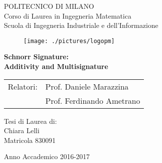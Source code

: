 \thispagestyle{empty}
\vspace*{-1.5cm} \bfseries{
\begin{center}
  \large
  POLITECNICO DI MILANO\\
  \medskip
  \normalsize
 Corso di Laurea in Ingegneria Matematica\\
  Scuola di Ingegneria Industriale e dell’Informazione\\
  \medskip
  
  \begin{figure}[htbp]
    \begin{center}
      \texttt{[image: ./pictures/logopm]}
    \end{center}
  \end{figure}
  \vspace*{0.3cm} \huge



  \textbf{Schnorr Signature: \\ Additivity and Multisignature}\\



\end{center}
\vspace*{8.0cm} \large
\begin{flushleft}

\begin{tabular}{ll}
	Relatori:& Prof. Daniele Marazzina\\
	 & Prof. Ferdinando Ametrano\\
\end{tabular}


\end{flushleft}
\vspace*{1.5cm}
\begin{flushright}


  Tesi di Laurea di:\\ Chiara Lelli \\Matricola 830091


\end{flushright}
\vspace*{0.5cm}
\begin{center}



  Anno Accademico 2016-2017
\end{center} \clearpage
}
